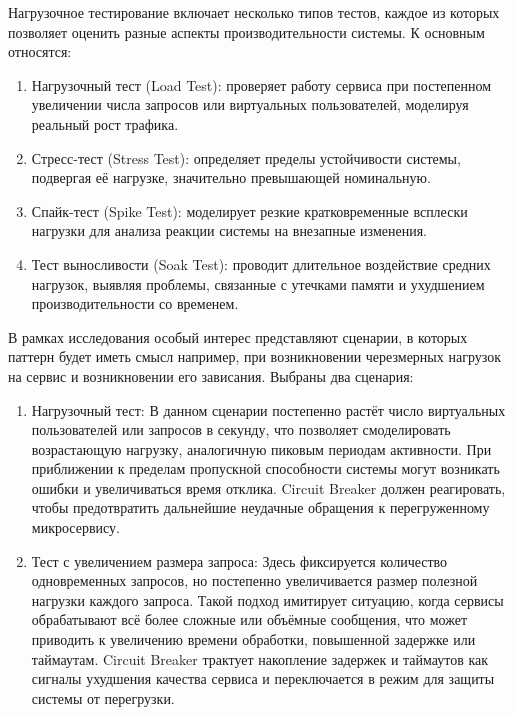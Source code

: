 Нагрузочное тестирование включает несколько типов тестов, каждое из которых позволяет оценить разные аспекты производительности системы. К основным относятся:
\begin{enumerate}
    \item Нагрузочный тест (Load Test)\cite{Waseem_2021}: проверяет работу сервиса при постепенном увеличении числа запросов или виртуальных пользователей, моделируя реальный рост трафика.

    \item Стресс-тест (Stress Test): определяет пределы устойчивости системы, подвергая её нагрузке, значительно превышающей номинальную.

    \item Спайк-тест (Spike Test): моделирует резкие кратковременные всплески нагрузки для анализа реакции системы на внезапные изменения.

    \item Тест выносливости (Soak Test): проводит длительное воздействие средних нагрузок, выявляя проблемы, связанные с утечками памяти и ухудшением производительности со временем.
\end{enumerate}
В рамках исследования особый интерес представляют сценарии, в которых паттерн будет иметь смысл например, при возникновении черезмерных нагрузок на сервис и возникновении его зависания. Выбраны два сценария:
\begin{enumerate}
    \item Нагрузочный тест: В данном сценарии постепенно растёт число виртуальных пользователей или запросов в секунду, что позволяет смоделировать возрастающую нагрузку, аналогичную пиковым периодам активности. При приближении к пределам пропускной способности системы могут возникать ошибки и увеличиваться время отклика. Circuit Breaker должен реагировать, чтобы предотвратить дальнейшие неудачные обращения к перегруженному микросервису. 

    \item Тест с увеличением размера запроса: Здесь фиксируется количество одновременных запросов, но постепенно увеличивается размер полезной нагрузки каждого запроса. Такой подход имитирует ситуацию, когда сервисы обрабатывают всё более сложные или объёмные сообщения, что может приводить к увеличению времени обработки, повышенной задержке или таймаутам. Circuit Breaker трактует накопление задержек и таймаутов как сигналы ухудшения качества сервиса и переключается в режим для защиты системы от перегрузки.
  \end{enumerate}
